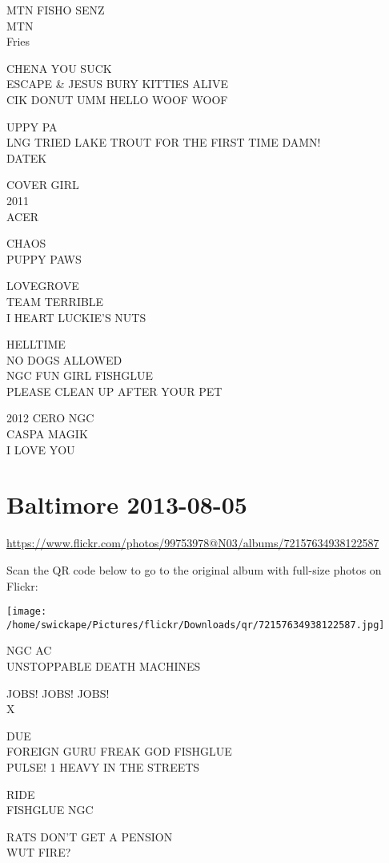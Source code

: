 \documentclass[10pt,letterpaper]{article}
\begin{document}
MTN FISHO SENZ\\
MTN\\
Fries

CHENA YOU SUCK\\
ESCAPE \& JESUS BURY KITTIES ALIVE\\
CIK DONUT UMM HELLO WOOF WOOF

UPPY PA\\
LNG TRIED LAKE TROUT FOR THE FIRST TIME DAMN!\\
DATEK

COVER GIRL\\
2011\\
ACER

CHAOS\\
PUPPY PAWS

LOVEGROVE\\
TEAM TERRIBLE\\
I HEART LUCKIE'S NUTS

HELLTIME\\
NO DOGS ALLOWED\\
NGC FUN GIRL FISHGLUE\\
PLEASE CLEAN UP AFTER YOUR PET

2012 CERO NGC\\
CASPA MAGIK\\
I LOVE YOU
\pagebreak

\section*{Baltimore 2013-08-05}

\url{https://www.flickr.com/photos/99753978@N03/albums/72157634938122587}

Scan the QR code below to go to the original album with full-size photos on Flickr:

\texttt{[image: /home/swickape/Pictures/flickr/Downloads/qr/72157634938122587.jpg]}
\pagebreak

NGC AC\\
UNSTOPPABLE DEATH MACHINES

JOBS! JOBS! JOBS!\\
X

DUE\\
FOREIGN GURU FREAK GOD FISHGLUE\\
PULSE! 1 HEAVY IN THE STREETS

RIDE\\
FISHGLUE NGC

RATS DON'T GET A PENSION\\
WUT FIRE?
\end{document}
